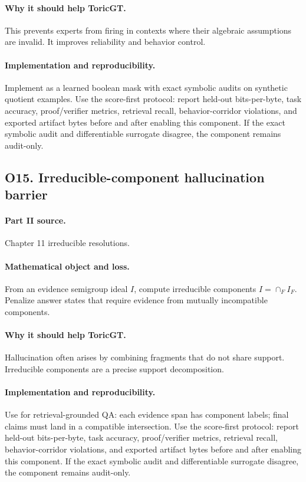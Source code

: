 \documentclass[11pt]{article}
\theoremstyle{definition}
\begin{document}
\paragraph{Why it should help ToricGT.} This prevents experts from firing in contexts where their algebraic assumptions are invalid.  It improves reliability and behavior control.
\paragraph{Implementation and reproducibility.} Implement as a learned boolean mask with exact symbolic audits on synthetic quotient examples.  Use the score-first protocol: report held-out bits-per-byte, task accuracy, proof/verifier metrics, retrieval recall, behavior-corridor violations, and exported artifact bytes before and after enabling this component.  If the exact symbolic audit and differentiable surrogate disagree, the component remains audit-only.


\subsection{O15. Irreducible-component hallucination barrier}
\paragraph{Part II source.} Chapter 11 irreducible resolutions.
\paragraph{Mathematical object and loss.} From an evidence semigroup ideal $I$, compute irreducible components $I=\cap_F I_F$.  Penalize answer states that require evidence from mutually incompatible components.
\paragraph{Why it should help ToricGT.} Hallucination often arises by combining fragments that do not share support.  Irreducible components are a precise support decomposition.
\paragraph{Implementation and reproducibility.} Use for retrieval-grounded QA: each evidence span has component labels; final claims must land in a compatible intersection.  Use the score-first protocol: report held-out bits-per-byte, task accuracy, proof/verifier metrics, retrieval recall, behavior-corridor violations, and exported artifact bytes before and after enabling this component.  If the exact symbolic audit and differentiable surrogate disagree, the component remains audit-only.
\end{document}
